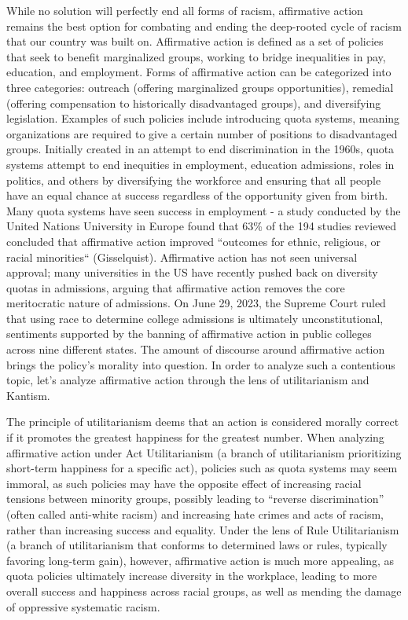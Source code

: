 \documentclass[12pt, a4paper, twoside]{article}
\begin{document}
While no solution will perfectly end all forms of racism, affirmative action remains the best option for combating and ending the deep-rooted cycle of racism that our country was built on. Affirmative action is defined as a set of policies that seek to benefit marginalized groups, working to bridge inequalities in pay, education, and employment. Forms of affirmative action can be categorized into three categories: outreach (offering marginalized groups opportunities), remedial (offering compensation to historically disadvantaged groups), and diversifying legislation. Examples of such policies include introducing quota systems, meaning organizations are required to give a certain number of positions to disadvantaged groups. Initially created in an attempt to end discrimination in the 1960s, quota systems attempt to end inequities in employment, education admissions, roles in politics, and others by diversifying the workforce and ensuring that all people have an equal chance at success regardless of the opportunity given from birth. Many quota systems have seen success in employment - a study conducted by the United Nations University in Europe found that 63\% of the 194 studies reviewed concluded that affirmative action improved “outcomes for ethnic, religious, or racial minorities“ (Gisselquist). Affirmative action has not seen universal approval; many universities in the US have recently pushed back on diversity quotas in admissions, arguing that affirmative action removes the core meritocratic nature of admissions. On June 29, 2023, the Supreme Court ruled that using race to determine college admissions is ultimately unconstitutional, sentiments supported by the banning of affirmative action in public colleges across nine different states. The amount of discourse around affirmative action brings the policy’s morality into question. In order to analyze such a contentious topic, let’s analyze affirmative action through the lens of utilitarianism and Kantism. 

The principle of utilitarianism deems that an action is considered morally correct if it promotes the greatest happiness for the greatest number. When analyzing affirmative action under Act Utilitarianism (a branch of utilitarianism prioritizing short-term happiness for a specific act), policies such as quota systems may seem immoral, as such policies may have the opposite effect of increasing racial tensions between minority groups, possibly leading to “reverse discrimination” (often called anti-white racism) and increasing hate crimes and acts of racism, rather than increasing success and equality. Under the lens of Rule Utilitarianism (a branch of utilitarianism that conforms to determined laws or rules, typically favoring long-term gain), however, affirmative action is much more appealing, as quota policies ultimately increase diversity in the workplace, leading to more overall success and happiness across racial groups, as well as mending the damage of oppressive systematic racism.
\end{document}
